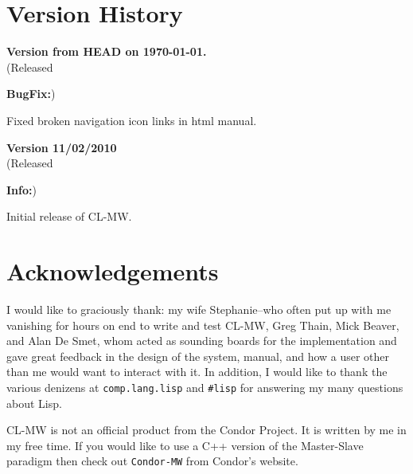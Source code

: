 \documentclass[titlepage,12pt]{book}
\newcommand{\xsmall}{\latexhtml{\small}{}}
\newcommand{\xnormalsize}{\latexhtml{\normalsize}{}}
\newcommand{\mw}{Master-Slave\xspace}
\newcommand{\clmw}{\xsmall\textsc{CL-MW}\xnormalsize\xspace}
\newcommand{\bold}[1]{\textbf{#1}\xspace}
\newenvironment{verhist}[2]
	{\noindent\textbf{Version #1}\\\indent\xsmall(Released #2)\xnormalsize\begin{itemize}}
	{\end{itemize}}
\newcommand{\info}{\item \bold{Info:}\xspace}
\newcommand{\bugfix}{\item \bold{BugFix:}\xspace}
\begin{document}
\chapter{\label{version-history}Version History}


\begin{verhist}{0.2}{from HEAD on \today.}
\bugfix Fixed broken navigation icon links in html manual.
\end{verhist}

\begin{verhist}{0.1}{11/02/2010}
\info Initial release of \clmw.
\end{verhist}

\chapter{Acknowledgements}

I would like to graciously thank: my wife Stephanie--who often put
up with me vanishing for hours on end to write and test \clmw, Greg
Thain, Mick Beaver, and Alan De Smet, whom acted as sounding boards
for the implementation and gave great feedback in the design of the
system, manual, and how a user other than me would want to interact
with it. In addition, I would like to thank the various denizens at
\texttt{comp.lang.lisp} and \texttt{\#lisp} for answering my many
questions about Lisp.

\clmw is not an official product from the Condor Project. It is written
by me in my free time. If you would like to use a C++ version of the
\mw paradigm then check out \texttt{Condor-MW} from Condor's website.

\backmatter
\end{document}

